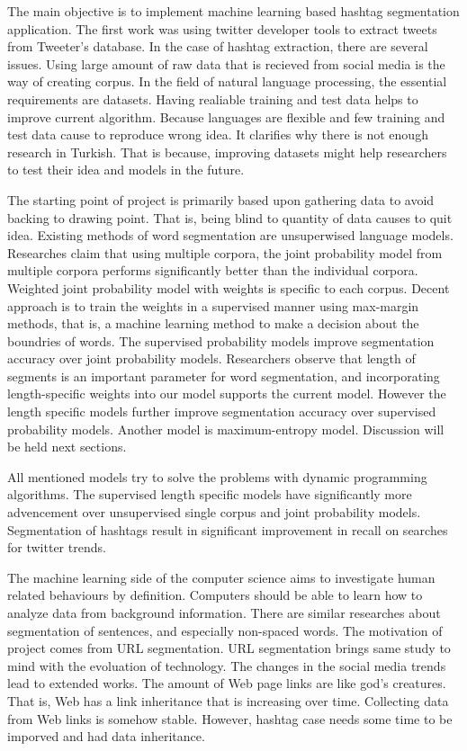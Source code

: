 \documentclass[12pt]{comjnl}
\begin{document}
The main objective is to implement machine learning based hashtag segmentation application.
The first work was using twitter developer tools to 
extract tweets from Tweeter's database. In the case of hashtag extraction, there are several issues.
Using large amount of raw data that 
is recieved from social media is the way of creating corpus. In the field of natural language 
processing, the essential requirements are datasets. Having realiable training and test data helps to improve
current algorithm. Because languages are flexible and few training and test data cause to 
reproduce wrong idea. It clarifies why there is not enough
research in Turkish. That is because, improving datasets might help researchers to test their idea and
models in the future.

The starting point of project is primarily based upon gathering data to avoid
backing to drawing point. That is, being blind to quantity of data causes to quit idea.
Existing methods of word segmentation are unsuperwised language models. Researches claim that
using multiple corpora, the joint probability model from multiple corpora performs significantly 
better than the individual corpora. Weighted joint probability model with weights is specific to each corpus. Decent approach is to train the weights in a supervised manner using max-margin methods, that is, a machine learning method to make a decision about the boundries of words.
The supervised probability models improve segmentation accuracy over joint probability models. 
Researchers observe that length of segments is an important parameter for word segmentation, and 
incorporating length-specific weights into our model supports the current model.
However the length specific models further improve segmentation accuracy over supervised 
probability models. Another model is maximum-entropy model. Discussion will be held next sections.

All mentioned models try to solve the problems with dynamic programming algorithms. The supervised length specific models have significantly more advencement over unsupervised single corpus and joint probability models. Segmentation of hashtags result in significant improvement in recall on searches for twitter trends.

The machine learning side of the computer science aims to investigate human related behaviours by definition. Computers should be able to learn how to analyze data from background information. There are similar researches about segmentation of sentences, and especially non-spaced words. The motivation of project comes from URL segmentation. URL segmentation brings same study to mind with the
evoluation of technology. The changes in the social media trends lead to extended works. The amount of Web page links are like god's creatures. That is, Web has a link inheritance that is increasing over time. Collecting data from Web links is somehow stable. However, hashtag case needs some time to be imporved and had data inheritance.
\end{document}
